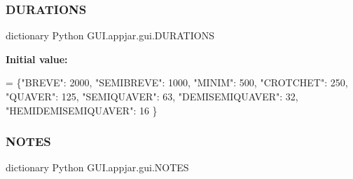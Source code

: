\begin{DoxyVerb}
\subsubsection{\texorpdfstring{D\+U\+R\+A\+T\+I\+O\+NS}{DURATIONS}}
{\footnotesize\ttfamily dictionary Python G\+U\+I.\+appjar.\+gui.\+D\+U\+R\+A\+T\+I\+O\+NS\hspace{0.3cm}{\ttfamily [static]}}

{\bfseries Initial value\+:}
\begin{DoxyCode}
=  \{\textcolor{stringliteral}{"BREVE"}: 2000, \textcolor{stringliteral}{"SEMIBREVE"}: 1000, \textcolor{stringliteral}{"MINIM"}: 500,
                \textcolor{stringliteral}{"CROTCHET"}: 250, \textcolor{stringliteral}{"QUAVER"}: 125, \textcolor{stringliteral}{"SEMIQUAVER"}: 63,
                \textcolor{stringliteral}{"DEMISEMIQUAVER"}: 32, \textcolor{stringliteral}{"HEMIDEMISEMIQUAVER"}: 16
    \}
\end{DoxyCode}
\mbox{\label{class_python_01_g_u_i_1_1appjar_1_1gui_a6598134f18700f3cdd8b3e5209cfd475}} 
\subsubsection{\texorpdfstring{N\+O\+T\+ES}{NOTES}}
{\footnotesize\ttfamily dictionary Python G\+U\+I.\+appjar.\+gui.\+N\+O\+T\+ES\hspace{0.3cm}{\ttfamily [static]}}


\end{DoxyVerb}
